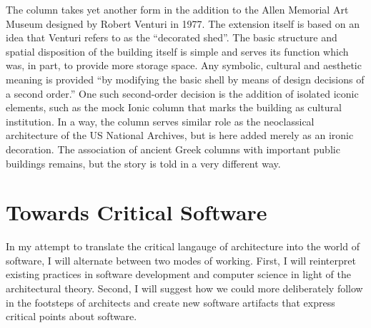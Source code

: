 The column takes yet another form in the addition to the Allen Memorial Art Museum designed by
Robert Venturi in 1977. The extension itself is based on an idea that Venturi refers to as
the ``decorated shed''. The basic structure and spatial disposition of the building itself is
simple and serves its function which was, in part, to provide more storage space.
Any symbolic, cultural and aesthetic meaning is provided ``by modifying the basic shell by means
of design decisions of a second order.'' One such second-order
decision is the addition of isolated iconic elements, such as the mock Ionic column that
marks the building as cultural institution. In a way, the column serves similar role as the
neoclassical architecture of the US National Archives, but is here added merely as an ironic
decoration. The association of ancient Greek columns with important public buildings remains,
but the story is told in a very different way.

%
%
%
%

\section{Towards Critical Software}

In my attempt to translate the critical langauge of architecture into the world of software,
I will alternate between two modes of working. First, I will reinterpret existing practices
in software development and computer science in light of the architectural theory. Second,
I will suggest how we could more deliberately follow in the footsteps of architects and
create new software artifacts that express critical points about software.


